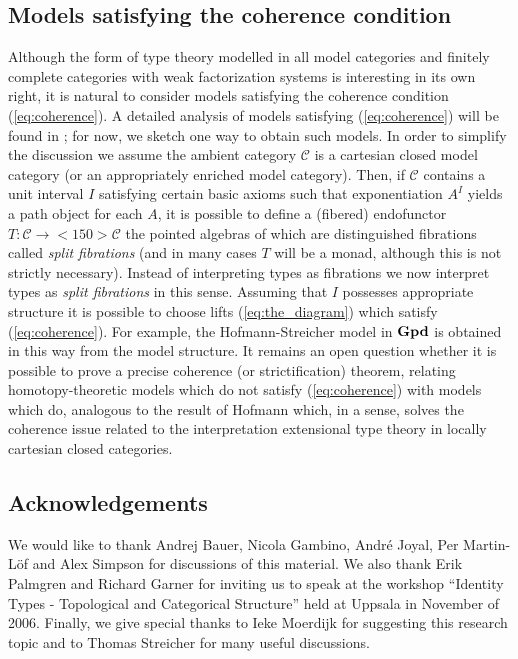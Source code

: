 \documentclass[12pt]{amsart}
\newcommand{\groupoids}{\textnormal{\textbf{Gpd}}}
\theoremstyle{definition}
\theoremstyle{remark}
\begin{document}
\subsection{Models satisfying the coherence condition}

Although the form of type theory modelled in all model categories and
finitely complete categories with weak factorization systems is
interesting in its own right, it is natural to consider models
satisfying the coherence condition (\ref{eq:coherence}).  A detailed
analysis of models satisfying (\ref{eq:coherence}) will be found in
\cite{Warren:PhD}; for now, we sketch one way to obtain such models.
In order to simplify the discussion we assume
the ambient category $\mathcal{C}$ is a cartesian closed model
category (or an appropriately enriched model category).  Then, if
$\mathcal{C}$ contains a unit interval $I$ satisfying certain basic
axioms such that exponentiation $A^{I}$ yields a path object for each
$A$, it is possible to define a (fibered) endofunctor
$T:\mathcal{C}\to<150>\mathcal{C}$ the pointed algebras of which are
distinguished fibrations called \emph{split fibrations} (and in many
cases $T$ will be a monad, although this is not strictly necessary).
Instead of interpreting types as fibrations we now interpret types as
\emph{split fibrations} in this sense.  Assuming that $I$ possesses
appropriate structure it is possible to choose lifts
(\ref{eq:the_diagram}) which satisfy (\ref{eq:coherence}).  For
example, the Hofmann-Streicher model in $\groupoids$ is obtained in
this way from the model structure.  It remains an open question whether it
is possible to prove a precise coherence (or strictification) theorem,
relating homotopy-theoretic models which do not satisfy (\ref{eq:coherence})
with models which do, analogous to the result of Hofmann
\cite{Hofmann:OITTLCCC} which, in a sense, solves the coherence issue
related to the interpretation extensional type theory in locally
cartesian closed categories.  
 
\subsection{Acknowledgements}

We would like to thank Andrej Bauer, Nicola Gambino, Andr\'{e} Joyal,
Per Martin-L\"{o}f and Alex Simpson for discussions of this material.
We also thank Erik Palmgren and Richard Garner for inviting us to
speak at the workshop ``Identity Types - Topological and Categorical
Structure'' held at Uppsala in November of 2006.  Finally, we give special
thanks to Ieke Moerdijk for suggesting this research topic and to
Thomas Streicher for many useful discussions.
\end{document}
